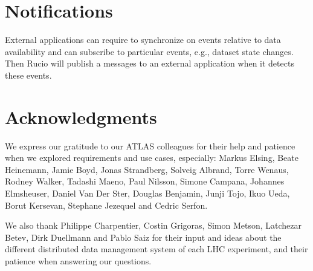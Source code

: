 \documentclass{atlasnote}
\begin{document}
\section{Notifications}
\label{overview_Notifications:notifications}

External applications can require to synchronize on events relative to data availability and can subscribe to particular events, e.g., dataset state changes. Then Rucio will publish a messages to an external application when it detects these events.

\section*{Acknowledgments}
\label{Acknowledgments:acknowledgments}
We express our gratitude to our ATLAS colleagues for their help and patience when we explored requirements and use cases, especially: Markus Elsing, Beate Heinemann, Jamie Boyd, Jonas Strandberg, Solveig Albrand, Torre Wenaus, Rodney Walker, Tadashi Maeno, Paul Nilsson, Simone Campana, Johannes Elmsheuser, Daniel Van Der Ster, Douglas Benjamin, Junji Tojo, Ikuo Ueda, Borut Kersevan, Stephane Jezequel and Cedric Serfon.

We also thank Philippe Charpentier, Costin Grigoras, Simon Metson, Latchezar Betev, Dirk Duellmann and Pablo Saiz for their input and ideas about the different distributed data management system of each LHC experiment, and their patience when answering our questions.

\newpage

\label{rucio:appendices}
\end{document}
